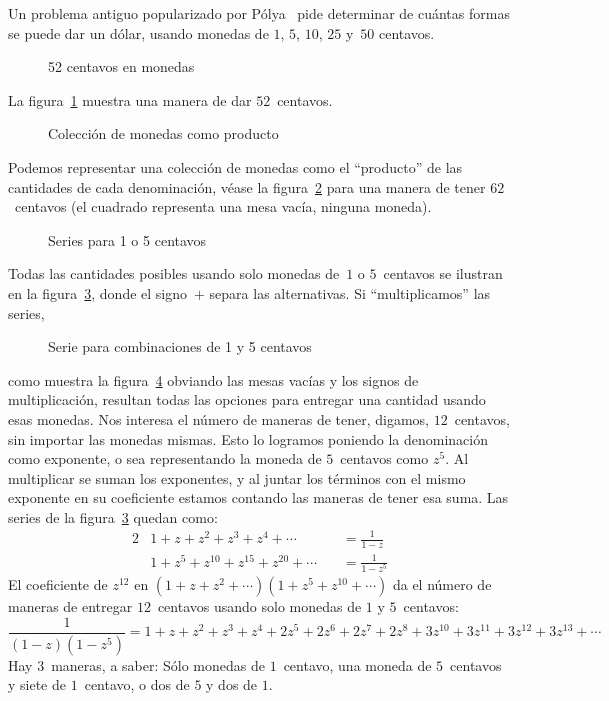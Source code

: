   Un problema antiguo popularizado por Pólya~%
    \cite{polya56:_picture_writing}%
  pide determinar de cuántas formas se puede dar un dólar,
  usando monedas de \(1\), \(5\), \(10\), \(25\) y~\(50\) centavos.
  \begin{figure}[ht]
    \centering
    \caption{52 centavos en monedas}
    \label{fig:coins-52}
  \end{figure}
  La figura~\ref{fig:coins-52}
  muestra una manera de dar \(52\)~centavos.
  \begin{figure}[ht]
    \centering
    \caption{Colección de monedas como producto}
    \label{fig:coins-product}
  \end{figure}
  Podemos representar una colección de monedas
  como el ``producto'' de las cantidades de cada denominación,
  véase la figura~\ref{fig:coins-product}
  para una manera de tener \(62\)~centavos
  (el cuadrado representa una mesa vacía,
   ninguna moneda).
  \begin{figure}[ht]
    \centering
    \caption{Series para 1 o 5 centavos}
    \label{fig:coins-1+5s}
  \end{figure}
  Todas las cantidades posibles
  usando solo monedas de~\(1\) o \(5\)~centavos
  se ilustran en la figura~\ref{fig:coins-1+5s},
  donde el signo~\(+\) separa las alternativas.
  Si ``multiplicamos'' las series,
  \begin{figure}[ht]
    \centering
    \caption{Serie para combinaciones de 1 y 5 centavos}
    \label{fig:coins-1x5s}
  \end{figure}
  como muestra la figura~\ref{fig:coins-1x5s}
  obviando las mesas vacías y los signos de multiplicación,
  resultan todas las opciones
  para entregar una cantidad usando esas monedas.
  Nos interesa el número de maneras de tener,
  digamos,
  \(12\)~centavos,
  sin importar las monedas mismas.
  Esto lo logramos poniendo la denominación como exponente,
  o sea representando la moneda de \(5\)~centavos como \(z^5\).
  Al multiplicar se suman los exponentes,
  y al juntar los términos con el mismo exponente
  en su coeficiente estamos contando las maneras de tener esa suma.
  Las series de la figura~\ref{fig:coins-1+5s} quedan como:
  \begin{alignat*}{2}
    &1 + z + z^2 + z^3 + z^4 + \dotsb
      &\,&= \frac{1}{1 - z} \\
    &1 + z^5 + z^{10} + z^{15} + z^{20} + \dotsb
      &&= \frac{1}{1 - z^5}
  \end{alignat*}
  El coeficiente de \(z^{12}\)
  en \((1 + z + z^2 + \dotsb) (1 + z^5 + z^{10} + \dotsb)\)
  da el número de maneras de entregar \(12\)~centavos
  usando solo monedas de \(1\) y \(5\)~centavos:
  \begin{equation*}
    \frac{1}{(1 - z) (1 - z^5)}
      = 1 + z + z^2 + z^3 + z^4 + 2 z^5 + 2 z^6 + 2 z^7
	  + 2 z^8 + 3 z^{10} + 3 z^{11} + 3 z^{12} + 3 z^{13}
	  + \dotsb
  \end{equation*}
  Hay \(3\)~maneras,
  a saber:
  Sólo monedas de \(1\)~centavo,
  una moneda de \(5\)~centavos y siete de \(1\)~centavo,
  o dos de \(5\) y dos de \(1\).

